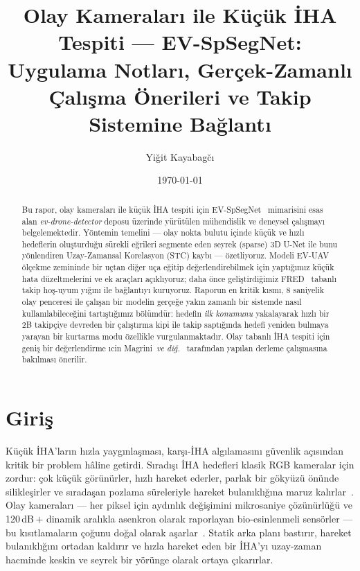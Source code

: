 \documentclass[11pt,a4paper]{article}
\title{Olay Kameraları ile Küçük \.{I}HA Tespiti --- EV-SpSegNet:\\
       Uygulama Notları, Ger\c{c}ek-Zamanl{\i} \c{C}al{\i}\c{s}ma
       \"Onerileri ve Takip Sistemine Ba\u{g}lant{\i}}
\author{Yi\u{g}it Kayabag\u{c}\i}
\date{\today}
\begin{document}
\maketitle

\begin{abstract}
Bu rapor, olay kameralar{\i} ile k\"u\c{c}\"uk \.{I}HA tespiti i\c{c}in
EV-SpSegNet~\cite{chen2025evspsegnet} mimarisini esas alan
\emph{ev-drone-detector} deposu \"uzerinde y\"ur\"ut\"ulen
m\"uhendislik ve deneysel \c{c}al{\i}\c{s}may{\i} belgelemektedir.
Y\"ontemin temelini --- olay nokta bulutu i\c{c}inde k\"u\c{c}\"uk ve
h{\i}zl{\i} hedeflerin olu\c{s}turdu\u{g}u s\"urekli e\u{g}rileri
segmente eden seyrek (sparse) 3D U-Net ile bunu y\"onlendiren
Uzay-Zamansal Korelasyon (STC) kayb{\i} --- \"ozetliyoruz. Modeli
EV-UAV~\cite{chen2025evspsegnet} \"ol\c{c}ekme zemininde bir u\c{c}tan
di\u{g}er u\c{c}a e\u{g}itip de\u{g}erlendirebilmek i\c{c}in
yapt{\i}\u{g}{\i}m{\i}z k\"u\c{c}\"uk hata d\"uzeltmelerini ve ek
ara\c{c}lar{\i} a\c{c}{\i}kl{\i}yoruz; daha \"once geli\c{s}tirdi\u{g}imiz
FRED~\cite{magrini2025fred} tabanl{\i} takip ho\c{s}-uyum y{\i}\u{g}{\i}n{\i}
ile ba\u{g}lant{\i}y{\i} kuruyoruz. Raporun en kritik k{\i}sm{\i}, 8
saniyelik olay penceresi ile \c{c}al{\i}\c{s}an bir modelin
ger\c{c}e\u{g}e yak{\i}n zamanl{\i} bir sistemde nas{\i}l
kullan{\i}labilece\u{g}ini tart{\i}\c{s}t{\i}\u{g}{\i}m{\i}z
b\"ol\"umd\"ur: hedefin \emph{ilk konumunu} yakalayarak h{\i}zl{\i} bir
2B takip\c{c}iye devreden bir \c{c}al{\i}\c{s}t{\i}rma kipi ile takip
sapt{\i}\u{g}{\i}nda hedefi yeniden bulmaya yarayan bir kurtarma
modu \"ozellikle vurgulanmaktad{\i}r. Olay tabanl{\i} \.{I}HA tespiti
i\c{c}in geni\c{s} bir de\u{g}erlendirme \i{c}in
Magrini~\textit{ve di\u{g}.}~\cite{magrini2025survey} taraf{\i}ndan
yap{\i}lan derleme \c{c}al{\i}\c{s}mas{\i}na bak{\i}lmas{\i} \"onerilir.
\end{abstract}

\section{Giri\c{s}}
K\"u\c{c}\"uk \.{I}HA'lar{\i}n h{\i}zla yayg{\i}nla\c{s}mas{\i},
kar\c{s}{\i}-\.{I}HA alg{\i}lamas{\i}n{\i} g\"uvenlik a\c{c}{\i}s{\i}ndan
kritik bir problem h\^aline getirdi. S{\i}rad{\i}\c{s}{\i} \.{I}HA
hedefleri klasik RGB kameralar i\c{c}in zordur: \c{c}ok k\"u\c{c}\"uk
g\"or\"un\"urler, h{\i}zl{\i} hareket ederler, parlak bir g\"oky\"uz\"u
\"on\"unde silikle\c{s}irler ve s{\i}rada\c{s}an pozlama s\"ureleriyle
hareket bulan{\i}kl{\i}\u{g}{\i}na maruz
kal{\i}rlar~\cite{magrini2025survey}. Olay kameralar{\i} --- her piksel
i\c{c}in ayd{\i}nl{\i}k de\u{g}i\c{s}imini mikrosaniye \c{c}\"oz\"un\"url\"u\u{g}\"u
ve 120\,dB\,$+$ dinamik aral{\i}kla asenkron olarak raporlayan
bio-esinlenmeli sens\"orler --- bu k{\i}s{\i}tlamalar{\i}n
\c{c}o\u{g}unu do\u{g}al olarak a\c{s}arlar~\cite{gallego2020eventsurvey}.
Statik arka plan{\i} bast{\i}r{\i}r, hareket bulan{\i}kl{\i}\u{g}{\i}n{\i}
ortadan kald{\i}r{\i}r ve h{\i}zla hareket eden bir \.{I}HA'y{\i} uzay-zaman
hacminde keskin ve seyrek bir y\"or\"unge olarak ortaya \c{c}{\i}kar{\i}rlar.
\end{document}
